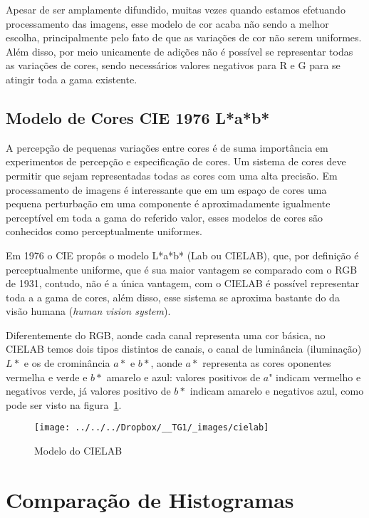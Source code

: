 \documentclass[ecp,tc]{iiufrgs}
\begin{document}
Apesar de ser amplamente difundido, muitas vezes quando estamos efetuando processamento das imagens, esse modelo de cor acaba não sendo a melhor escolha, principalmente pelo fato de que as variações de cor não serem uniformes. Além disso, por meio unicamente de adições não é possível se representar todas as variações de cores, sendo necessários valores negativos para R e G para se atingir toda a gama existente.

\subsection{Modelo de Cores CIE 1976 L*a*b*}

A percepção de pequenas variações entre cores é de suma importância em experimentos de percepção e especificação de cores. Um sistema de cores deve permitir que sejam representadas todas as cores com uma alta precisão. Em processamento de imagens é interessante que em um espaço de cores uma pequena perturbação em uma componente é aproximadamente igualmente perceptível em toda a gama do referido valor, esses modelos de cores são conhecidos como perceptualmente uniformes.

Em 1976 o CIE propôs o modelo L*a*b* (Lab ou CIELAB), que, por definição é perceptualmente uniforme, que é sua maior vantagem se comparado com o RGB de 1931, contudo, não é a única vantagem, com o CIELAB é possível representar toda a a gama de cores, além disso, esse sistema se aproxima bastante do da visão humana (\textit{human vision system}).

Diferentemente do RGB, aonde cada canal representa uma cor básica, no CIELAB temos dois tipos distintos de canais, o canal de luminância (iluminação) $ L* $ e os de crominância $a*$ e $b*$, aonde $a*$ representa as cores oponentes vermelha e verde e $b*$ amarelo e azul: valores positivos de $a$" indicam vermelho e negativos verde, já valores positivo de $b*$ indicam amarelo e negativos azul, como pode ser visto na figura~\ref{fig:cielab}.

\begin{figure}
	\centering
	\caption{Modelo do CIELAB}
	\texttt{[image: ../../../Dropbox/\_\_TG1/\_images/cielab]}
	\label{fig:cielab}
\end{figure}

\section{Comparação de Histogramas}
\end{document}
